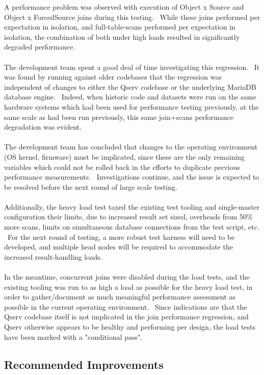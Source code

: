 \documentclass[DM,STR,toc]{lsstdoc}
\begin{document}
A performance problem was observed with execution of Object x Source and
Object x ForcedSource joins during this testing. ~While these joins
performed per expectation in isolation, and full-table-scans performed
per expectation in isolation, the combination of both under high loads
resulted in significantly degraded performance.\\
~\\
The development team spent a good deal of time investigating this
regression. ~It was found by running against older codebases that the
regression was independent of changes to either the Qserv codebase or
the underlying MariaDB database engine. ~Indeed, when historic code and
datasets were run on the same hardware systems which had been used for
performance testing previously, at the same scale as had been run
previously, this same join+scans performance degradation was evident.\\
~\\
The development team has concluded that changes to the operating
environment (OS kernel, firmware) must be implicated, since these are
the only remaining variables which could not be rolled back in the
efforts to duplicate previous performance measurements. ~Investigations
continue, and the issue is expected to be resolved before the next round
of large scale testing.\\
~\\
Additionally, the heavy load test taxed the existing test tooling and
single-master configuration their limits, due to increased result set
sized, overheads from 50\% more scans, limits on simultaneous database
connections from the test script, etc. ~For the next round of testing, a
more robust test harness will need to be developed, and multiple head
nodes will be required to accommodate the increased result-handling
loads.\\
~\\
In the meantime, concurrent joins were disabled during the load tests,
and the existing tooling was run to as high a load as possible for the
heavy load test, in order to gather/document as much meaningful
performance assessment as possible in the current operating environment.
~Since indications are that the Qserv codebase itself is not implicated
in the join performance regression, and Qserv otherwise appears to be
healthy and performing per design, the load tests have been marked with
a "conditional pass".


\subsection{Recommended Improvements}
\label{sect:recommendations}
\end{document}

